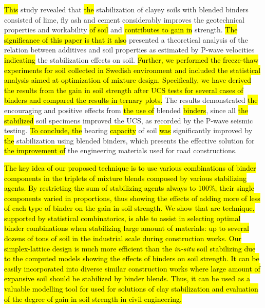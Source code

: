 \documentclass[constrmater,article,submit,pdftex,moreauthors]{Definitions/mdpi}
\begin{document}
\hl{This} study revealed that \hl{the }stabilization of clayey soils with blended binders consisted of lime, fly ash and cement considerably improves the geotechnical properties and workability \hl{of soil }and \hl{contributes to gain in }strength. \hl{The significance of this paper is that it also} presented a theoretical analysis of the relation between additives and soil properties as estimated by P-wave velocities \hl{indicating} the stabilization effects on soil. \hl{Further, we performed the freeze-thaw experiments for soil collected in Swedish environment and included the statistical analysis aimed at optimization of mixture design. Specifically, we have derived the results from the gain in soil strength after UCS tests for several cases of binders and compared the results in ternary plots. }The results demonstrated \hl{the }encouraging and positive effects from \hl{the use of }blended \hl{binders}, since all \hl{the stabilized }soil specimens improved the UCS, as recorded by\hl{ }the P-wave seismic testing. \hl{To conclude, the }bearing \hl{capacity} of soil \hl{was} significantly improved by \hl{the }stabilization using blended binders, which presents the effective solution for \hl{the improvement of} the engineering materials used for road constructions.

\hl{The key idea of our proposed technique is to use various combinations of binder components in the triplets of mixture blends composed by various stabilizing agents. By restricting the sum of stabilizing agents always to 100\%, their single components varied in proportions, thus showing the effects of adding more of less of each type of binder on the gain in soil strength. We show that are technique, supported by statistical combinatorics, is able to assist in selecting optimal binder combinations when stabilizing large amount of materials: up to several dozens of tons of soil in the industrial scale during construction works. Our simplex-lattice design is much more efficient than the \emph{in-situ} soil stabilizing due to the computed models showing the effects of  binders on soil strength. It can be easily incorporated into diverse similar construction works where large amount of expansive soil should be stabilized by binder blends. Thus, it can be used as a valuable modelling tool for used for solutions of clay stabilization and evaluation of the degree of gain in soil strength in civil engineering.}

\end{document}
